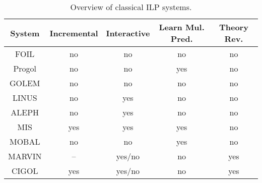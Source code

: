 \begin{table}[t]
\centering
\begin{tabular}{|c|c|c|c|c|}
\hline
System & Incremental & Interactive & Learn Mul. Pred. & Theory Rev.\\
\hline
FOIL & no & no & no & no \\
Progol & no & no & yes & no \\
GOLEM & no & no & no & no \\
LINUS & no & yes & no & no \\
ALEPH & no & yes & no & no \\
MIS & yes & yes & yes & no \\
MOBAL & no & no & yes & no \\
MARVIN & -- & yes/no & no & yes \\
CIGOL & yes & yes/no & no & yes \\
\hline
\end{tabular}
\caption{Overview of classical ILP systems.}
\label{tab:ilp}
\end{table}